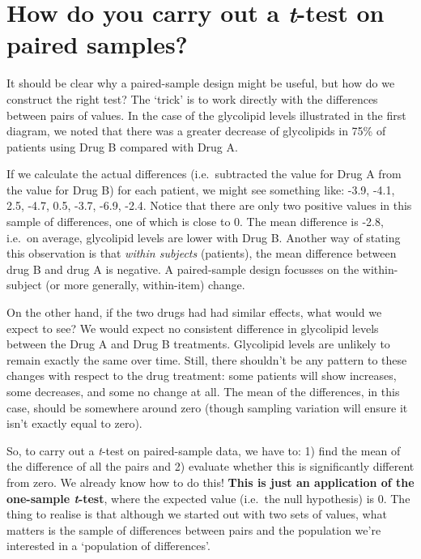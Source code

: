 \documentclass[
]{book}
\begin{document}
\hypertarget{how-do-you-carry-out-a-t-test-on-paired-samples}{%
\section{\texorpdfstring{How do you carry out a \emph{t}-test on paired samples?}{How do you carry out a t-test on paired samples?}}\label{how-do-you-carry-out-a-t-test-on-paired-samples}}

It should be clear why a paired-sample design might be useful, but how do we construct the right test? The `trick' is to work directly with the differences between pairs of values. In the case of the glycolipid levels illustrated in the first diagram, we noted that there was a greater decrease of glycolipids in 75\% of patients using Drug B compared with Drug A.

If we calculate the actual differences (i.e.~subtracted the value for Drug A from the value for Drug B) for each patient, we might see something like: -3.9, -4.1, 2.5, -4.7, 0.5, -3.7, -6.9, -2.4. Notice that there are only two positive values in this sample of differences, one of which is close to 0. The mean difference is -2.8, i.e.~on average, glycolipid levels are lower with Drug B. Another way of stating this observation is that \emph{within subjects} (patients), the mean difference between drug B and drug A is negative. A paired-sample design focusses on the within-subject (or more generally, within-item) change.

On the other hand, if the two drugs had had similar effects, what would we expect to see? We would expect no consistent difference in glycolipid levels between the Drug A and Drug B treatments. Glycolipid levels are unlikely to remain exactly the same over time. Still, there shouldn't be any pattern to these changes with respect to the drug treatment: some patients will show increases, some decreases, and some no change at all. The mean of the differences, in this case, should be somewhere around zero (though sampling variation will ensure it isn't exactly equal to zero).

So, to carry out a \emph{t}-test on paired-sample data, we have to: 1) find the mean of the difference of all the pairs and 2) evaluate whether this is significantly different from zero. We already know how to do this! \textbf{This is just an application of the one-sample \emph{t}-test}, where the expected value (i.e.~the null hypothesis) is 0. The thing to realise is that although we started out with two sets of values, what matters is the sample of differences between pairs and the population we're interested in a `population of differences'.
\end{document}
